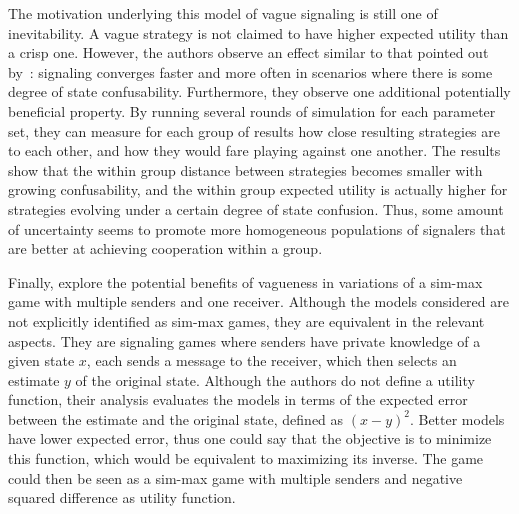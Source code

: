 \documentclass[a4paper]{article}
\begin{document}
The motivation underlying this model of vague signaling is still one of inevitability.
A vague strategy is not claimed to have higher expected utility than a crisp one.
However, the authors observe an effect similar to that pointed out by~\citeauthor{oconnor_evolution_2014}: signaling converges faster and more often in scenarios where there is some degree of state confusability.
Furthermore, they observe one additional potentially beneficial property.
By running several rounds of simulation for each parameter set, they can measure for each group of results how close resulting strategies are to each other, and how they would fare playing against one another.
The results show that the within group distance between strategies becomes smaller with growing confusability, and the within group expected utility is actually higher for strategies evolving under a certain degree of state confusion.
Thus, some amount of uncertainty seems to promote more homogeneous populations of signalers that are better at achieving cooperation within a group.

Finally, \textcite{lawry_vagueness_2017} explore the potential benefits of vagueness in variations of a sim-max game with multiple senders and one receiver.
Although the models considered are not explicitly identified as sim-max games, they are equivalent in the relevant aspects.
They are signaling games where senders have private knowledge of a given state $x$, each sends a message to the receiver, which then selects an estimate $y$ of the original state.
Although the authors do not define a utility function, their analysis evaluates the models in terms of the expected error between the estimate and the original state, defined as $(x-y)^2$.
Better models have lower expected error, thus one could say that the objective is to minimize this function, which would be equivalent to maximizing its inverse.
The game could then be seen as a sim-max game with multiple senders and negative squared difference as utility function.
\end{document}

